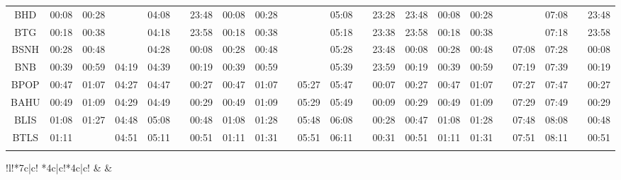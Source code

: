 \begin{center}
\begin{tabular}
{*{7}{c|}c!{\color{darkgreen}\vrule width 3pt}*{6}{c|}c!{\color{darkgreen}\vrule width 3pt}}
\hline
{}
 &  &  \\
\hline
BHD      & 
00:08 & 00:28 &       & 04:08 &  & 23:48 & 
00:08 & 00:28 &  &       & 05:08 &  & 23:28 & 23:48 &
00:08 & 00:28 &  &       & 07:08 &  & 23:48 \\
BTG      & 
00:18 & 00:38 &       & 04:18 & \dgr{}   & 23:58 & 
00:18 & 00:38 & \dgr{}   &       & 05:18 & \dgr{}   & 23:38 & 23:58 &
00:18 & 00:38 & \dgr{}   &       & 07:18 & \dgr{}   & 23:58 \\
BSNH     & 
00:28 & 00:48 &       & 04:28 & \dgr{}   & 00:08 & 
00:28 & 00:48 & \dgr{}   &       & 05:28 & \dgr{}   & 23:48 & 00:08 &
00:28 & 00:48 & \dgr{}   & 07:08 & 07:28 & \dgr{}   & 00:08 \\
BNB      & 
00:39 & 00:59 & 04:19 & 04:39 & \dgr{}   & 00:19 & 
00:39 & 00:59 & \dgr{}   &       & 05:39 & \dgr{}   & 23:59 & 00:19 &
00:39 & 00:59 & \dgr{}   & 07:19 & 07:39 & \dgr{}   & 00:19 \\
BPOP     & 
00:47 & 01:07 & 04:27 & 04:47 & \dgr{}   & 00:27 & 
00:47 & 01:07 & \dgr{}   & 05:27 & 05:47 & \dgr{}   & 00:07 & 00:27 &
00:47 & 01:07 & \dgr{}   & 07:27 & 07:47 & \dgr{}   & 00:27 \\
BAHU     & 
00:49 & 01:09 & 04:29 & 04:49 & \dgr{}   & 00:29 & 
00:49 & 01:09 & \dgr{}   & 05:29 & 05:49 & \dgr{}   & 00:09 & 00:29 &
00:49 & 01:09 & \dgr{}   & 07:29 & 07:49 & \dgr{}   & 00:29 \\
BLIS     & 
01:08 & 01:27 & 04:48 & 05:08 & \dgr{}   & 00:48 & 
01:08 & 01:28 & \dgr{}   & 05:48 & 06:08 & \dgr{}   & 00:28 & 00:47 &
01:08 & 01:28 & \dgr{}   & 07:48 & 08:08 & \dgr{}   & 00:48 \\
BTLS     & 
01:11 &       & 04:51 & 05:11 & \dgr{}   & 00:51 & 
01:11 & 01:31 & \dgr{}   & 05:51 & 06:11 & \dgr{}   & 00:31 & 00:51 &
01:11 & 01:31 & \dgr{}   & 07:51 & 08:11 & \dgr{}   & 00:51 \\
\myhline
\end{tabular}
\fi
\ifvampir
\begin{tabular}{!{\color{darkgreen}\vrule width 3pt}l!{\color{darkgreen}\vrule width 3pt}*{7}{c|}c!{\color{darkgreen}\vrule width 3pt}%
*{4}{c|}c!{\color{darkgreen}\vrule width 3pt}*{4}{c|}c!{\color{darkgreen}\vrule width 3pt}}
\hline
{}
 &  &  \\

\end{tabular}
\end{center}
